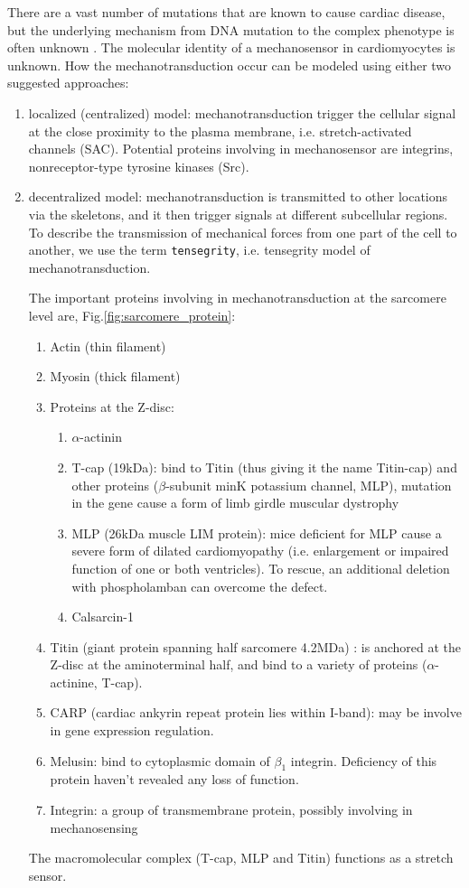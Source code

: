 There are a vast number of mutations that are known to cause cardiac
disease, but the underlying mechanism from DNA mutation to the complex phenotype
is often unknown \citep{knoll2003}. The molecular identity of a mechanosensor in
cardiomyocytes is unknown. How the mechanotransduction occur can be modeled
using either two suggested approaches:
\begin{enumerate}
  \item localized (centralized) model: mechanotransduction trigger the cellular
  signal at the close proximity to the plasma membrane, i.e. stretch-activated
  channels (SAC). Potential proteins involving in mechanosensor are integrins,
  nonreceptor-type tyrosine kinases (Src).

  \item decentralized model: mechanotransduction is transmitted to other
  locations via the skeletons, and it then trigger signals at different
  subcellular regions. To describe the transmission of mechanical forces from
  one part of the cell to another, we use the term \verb!tensegrity!, i.e.
  tensegrity model of mechanotransduction.

  The important proteins involving in mechanotransduction at the sarcomere level
are, Fig.\ref{fig:sarcomere_protein}:
\begin{enumerate}
  \item Actin (thin filament)
  \item Myosin (thick filament)
  \item Proteins at the Z-disc:
  \begin{enumerate}
      \item $\alpha$-actinin
	  \item T-cap (19kDa): bind to Titin (thus giving it the name Titin-cap) and
	  other proteins ($\beta$-subunit minK potassium channel, MLP),
	  mutation in the gene cause a form of limb girdle muscular dystrophy
  	  \item MLP (26kDa muscle LIM protein): mice deficient for MLP cause a severe
  	  form of dilated cardiomyopathy (i.e. enlargement or impaired function of
  	  one or both ventricles). To rescue, an additional deletion with
  	  phospholamban can overcome the defect.
  	  \item Calsarcin-1
  \end{enumerate}
  \item Titin (giant protein spanning half sarcomere 4.2MDa) : is anchored at
  the Z-disc at the aminoterminal half, and bind to a variety of proteins
  ($\alpha$-actinine, T-cap).

  \item CARP (cardiac ankyrin repeat protein lies within I-band): may be involve
  in gene expression regulation.

  \item Melusin: bind to cytoplasmic domain of $\beta_1$ integrin. Deficiency of
  this protein haven't revealed any loss of function.

  \item Integrin: a group of transmembrane protein, possibly involving in
  mechanosensing
\end{enumerate}
The macromolecular complex (T-cap, MLP and Titin) functions as a stretch sensor.
\end{enumerate}
